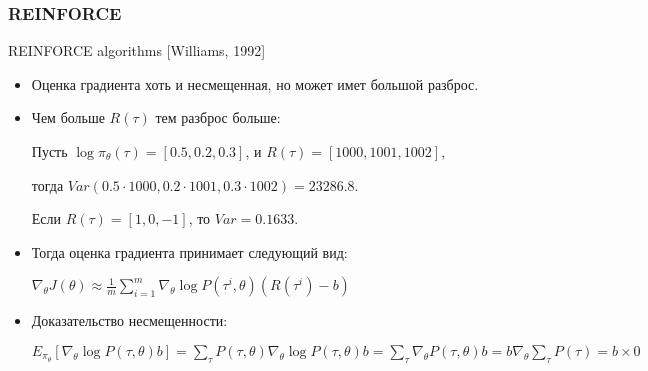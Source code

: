 \documentclass[fleqn, xcolor=x11names]{beamer}
\begin{document}
\begin{frame}[fragile]\frametitle{REINFORCE}

{\footnotesize
\begin{block}{REINFORCE algorithms [Williams, 1992]}

\begin{itemize}
\item Оценка градиента хоть и несмещенная, но может имет большой разброс.
\item Чем больше $R(\tau)$ тем разброс больше:

Пусть $\log \pi_{\theta}(\tau) = [0.5,0.2,0.3]$, и $R(\tau) = [1000,1001,1002]$,

тогда $Var(0.5 \cdot 1000,0.2 \cdot 1001,0.3 \cdot 1002) = 23286.8$.
 
Если $R(\tau) = [1,0,-1]$, то $Var = 0.1633$.
\item  Тогда оценка градиента принимает следующий вид:
\begin{center}
$\nabla_{\theta}J(\theta) \approx \frac{1}{m}\sum \limits_{i=1}^m \nabla_{\theta} \log P(\tau^i, \theta) (R(\tau^i) - b)$
\end{center}
\item Доказательство несмещенности:
\begin{center}
$   E_{\pi_{\theta}} \left[\nabla_{\theta} \log P(\tau, \theta)b \right] =  \sum \limits_{\tau} P(\tau, \theta) \nabla_{\theta} \log P(\tau, \theta)b = \sum \limits_{\tau} \nabla_{\theta}P(\tau, \theta)b = b \nabla_{\theta} \sum \limits_{\tau} P(\tau) = b \times 0$
\end{center}

\end{itemize} 
\end{block}
}
\end{frame}
\end{document}
